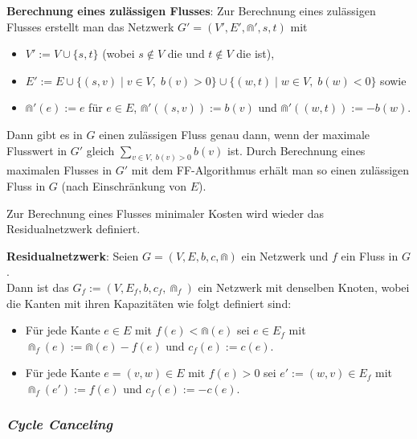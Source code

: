 \linie

\textbf{Berechnung eines zulässigen Flusses}:
Zur Berechnung eines zulässigen Flusses erstellt man das Netzwerk $G' = (V', E', \Cap', s, t)$
mit
\begin{itemize}
    \item
    $V' := V \cup \{s, t\}$
    (wobei $s \notin V$ die  und $t \notin V$ die  ist),

    \item
    $E' := E \cup \{(s, v) \;|\; v \in V,\; b(v) > 0\} \cup \{(w, t) \;|\; w \in V,\; b(w) < 0\}$
    sowie

    \item
    $\Cap'(e) := e$ für $e \in E$, $\Cap'((s, v)) := b(v)$ und $\Cap'((w, t)) := -b(w)$.
\end{itemize}
Dann gibt es in $G$ einen zulässigen Fluss genau dann, wenn der maximale Flusswert in $G'$
gleich $\sum_{v \in V,\; b(v) > 0} b(v)$ ist.
Durch Berechnung eines maximalen Flusses in $G'$ mit dem FF-Algorithmus erhält man so einen
zulässigen Fluss in $G$ (nach Einschränkung von $E$).

\linie

Zur Berechnung eines Flusses minimaler Kosten wird wieder das Residualnetzwerk definiert.

\textbf{Residualnetzwerk}:
Seien $G = (V, E, b, c, \Cap)$ ein Netzwerk und $f$ ein Fluss in $G$.\\
Dann ist das  $G_f := (V, E_f, b, c_f, \Cap_f)$ ein Netzwerk
mit denselben Knoten, wobei die Kanten mit ihren Kapazitäten wie folgt definiert sind:
\begin{itemize}
    \item
    Für jede Kante $e \in E$ mit $f(e) < \Cap(e)$ sei $e \in E_f$ mit\\
    $\Cap_f(e) := \Cap(e) - f(e)$ und $c_f(e) := c(e)$.

    \item
    Für jede Kante $e = (v, w) \in E$ mit $f(e) > 0$ sei $e' := (w, v) \in E_f$ mit\\
    $\Cap_f(e') := f(e)$ und $c_f(e) := -c(e)$.
\end{itemize}

\pagebreak

\subsubsection{%
    \emph{Cycle Canceling}%
}


